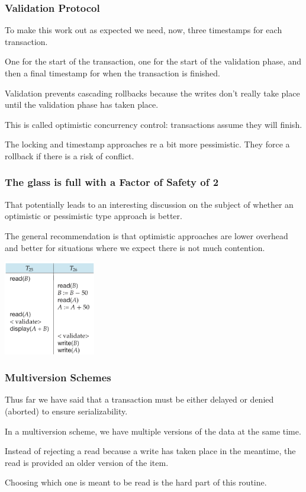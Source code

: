 \begin{frame}
\frametitle{Validation Protocol}

To make this work out as expected we need, now, three timestamps for each transaction. 

One for the start of the transaction, one for the start of the validation phase, and then a final timestamp for when the transaction is finished.

Validation prevents cascading rollbacks because the writes don't really take place until the validation phase has taken place.

This is called \alert{optimistic concurrency control}: transactions assume they will finish. 

The locking and timestamp approaches re a bit more pessimistic. They force a rollback if there is a risk of conflict.

\end{frame}



\begin{frame}
\frametitle{The glass is full with a Factor of Safety of 2}

That potentially leads to an interesting discussion on the subject of whether an optimistic or pessimistic type approach is better.

The general recommendation is that optimistic approaches are lower overhead and better for situations where we expect there is not much contention.

\begin{center}
	\includegraphics[width=0.3\textwidth]{images/validation}
\end{center}

\end{frame}

\begin{frame}
\frametitle{Multiversion Schemes}

Thus far we have said that a transaction must be either delayed or denied (aborted) to ensure serializability. 

In a multiversion scheme, we have multiple versions of the data at the same time.

Instead of rejecting a read because a write has taken place in the meantime, the read is provided an older version of the item. 

Choosing which one is meant to be read is the hard part of this routine.
\end{frame}

